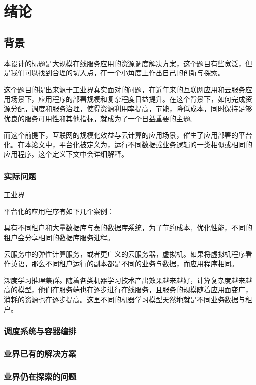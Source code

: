 
\section{绪论}

\subsection{背景}

本设计的标题是大规模在线服务应用的资源调度解决方案，这个题目有些宽泛，但是我们可以找到合理的切入点，在一个小角度上作出自己的创新与探索。

这个题目的提出来源于工业界真实面对的问题，在近年来的互联网应用和云服务应用场景下，应用程序的部署规模和复杂程度日益提升。在这个背景下，如何完成资源分配，调度和服务治理，使得资源利用率提高，节能，降低成本，同时保持足够优良的服务可用性和其他指标，就成为了一个日益重要的主题。

而这个前提下，互联网的规模化效益与云计算的应用场景，催生了应用部署的平台化。在本论文中，平台化被定义为，运行不同数据或业务逻辑的一类相似或相同的应用程序。这个定义下文中会详细解释。

\subsubsection{实际问题}

工业界

平台化的应用程序有如下几个案例：

具有不同租户和大量数据库与表的数据库系统，为了节约成本，优化性能，不同的租户会分享相同的数据库服务进程。

云服务中的弹性计算服务，或者更广义的云服务器，虚拟机。如果将虚拟机程序看作英语，那么不同租户运行的副本都是不同的业务与数据，而应用程序相同。

深度学习推理集群。随着各类机器学习技术产出效果越来越好，计算复杂度越来越高的模型，他们在服务端也在逐步进行在线服务，且服务的规模随着应用面变广，消耗的资源也在逐步提高。这里不同的机器学习模型天然地就是不同业务数据与租户。

\subsubsection{调度系统与容器编排}

\subsubsection{业界已有的解决方案}

\subsubsection{业界仍在探索的问题}
